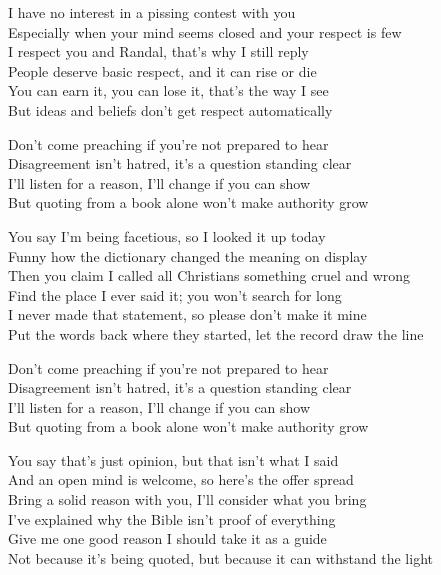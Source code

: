 \begin{lyrics}
I have no interest in a pissing contest with you\\
Especially when your mind seems closed and your respect is few\\
I respect you and Randal, that's why I still reply\\
People deserve basic respect, and it can rise or die\\
You can earn it, you can lose it, that's the way I see\\
But ideas and beliefs don't get respect automatically

Don't come preaching if you're not prepared to hear\\
Disagreement isn't hatred, it's a question standing clear\\
I'll listen for a reason, I'll change if you can show\\
But quoting from a book alone won't make authority grow

You say I'm being facetious, so I looked it up today\\
Funny how the dictionary changed the meaning on display\\
Then you claim I called all Christians something cruel and wrong\\
Find the place I ever said it; you won't search for long\\
I never made that statement, so please don't make it mine\\
Put the words back where they started, let the record draw the line

Don't come preaching if you're not prepared to hear\\
Disagreement isn't hatred, it's a question standing clear\\
I'll listen for a reason, I'll change if you can show\\
But quoting from a book alone won't make authority grow

You say that's just opinion, but that isn't what I said\\
And an open mind is welcome, so here's the offer spread\\
Bring a solid reason with you, I'll consider what you bring\\
I've explained why the Bible isn't proof of everything\\
Give me one good reason I should take it as a guide\\
Not because it's being quoted, but because it can withstand the light


\end{lyrics}
